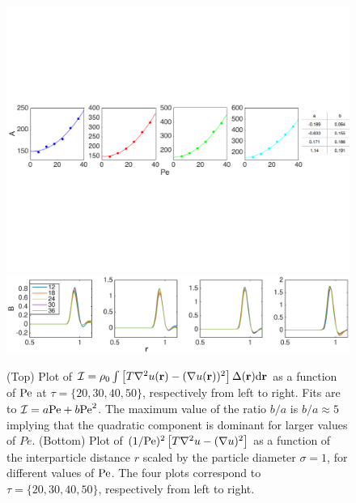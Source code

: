 \documentclass[pre, superscriptaddress, twocolumn,pre]{revtex4-1}
\newcommand{\dd}{\text{d}}
\begin{document}
\begin{figure}
	\centering
	\includegraphics[width=\linewidth]{integral_A2.pdf}
	\includegraphics[width=1.0\linewidth]{del_u_sq-del_sq_u_overPesq.eps}
	\caption{\label{fig:kirk}
		(Top) Plot of ${\cal I} = \rho_0 \int \left[ T\nabla^2 u({\bf r}) - (\nabla u({\bf r}))^2\right] \Delta({\bf r}) \dd{\bf r}$ as a function of $\rm Pe$ at $\tau=\{20,30,40,50\}$, respectively from left to right. Fits are to ${\cal I} = a {\rm Pe} + b {\rm Pe}^2$. The maximum value of the ratio $b/a$ is $b/a \approx 5$ implying that the quadratic component is dominant for larger values of $Pe$. 
		(Bottom) Plot of $(1/{\rm Pe})^2 \left[T \nabla^2 u - (\nabla u)^2\right]$ as a function of the interparticle distance $r$ scaled by the particle diameter $\sigma=1$, for different values of ${\rm Pe}$. The four plots correspond to $\tau =\{20,30,40,50\}$, respectively from left to right.
	}
\end{figure}
\end{document}
